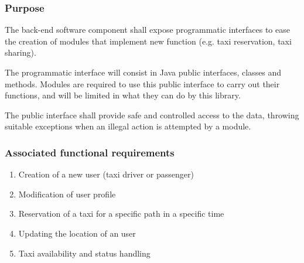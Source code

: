 \subsubsection{Purpose}

The back-end software component shall expose programmatic interfaces to ease the creation of modules that implement new function (e.g. taxi reservation, taxi sharing).

The programmatic interface will consist in Java public interfaces, classes and methods.
Modules are required to use this public interface to carry out their functions, and will be limited in what they can do by this library.

The public interface shall provide safe and controlled access to the data, throwing suitable exceptions when an illegal action is attempted by a module.

\subsubsection{Associated functional requirements}
\begin{enumerate}
\item Creation of a new user (taxi driver or passenger)
\item Modification of user profile
\item Reservation of a taxi for a specific path in a specific time
\item Updating the location of an user
\item Taxi availability and status handling


\end{enumerate}
